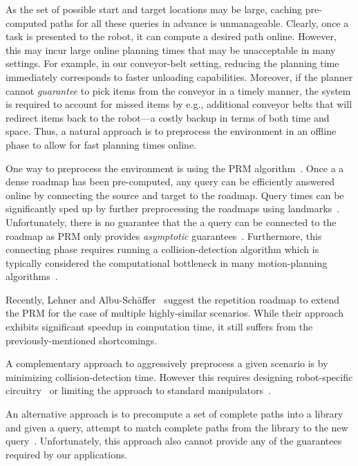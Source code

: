 \documentclass[letterpaper, 10 pt, conference]{ieeeconf}  %
\begin{document}
As the set of possible start and target locations may be large, caching pre-computed paths for all these queries in advance is unmanageable. 
Clearly, once a task is presented to the robot, it can compute a desired path online.
However, this may incur large online planning times that may be unacceptable in many settings.
For example, in our conveyor-belt setting, reducing the planning time immediately corresponds to faster unloading capabilities. 
Moreover, if the planner cannot \emph{guarantee} to pick items from the conveyor in a timely manner, the system is required to account for missed items by e.g., additional conveyor belts that will redirect items back to the robot---a costly backup in terms of both time and space.
Thus, a natural approach is to preprocess the environment in an offline phase to allow for fast planning times online.

One way to preprocess the environment is using the \textsf{PRM} algorithm~\cite{kavraki1996probabilistic}.
Once a a dense roadmap has been pre-computed, any query can be efficiently answered online by connecting the source and target to the roadmap. 
Query times can be significantly sped up by further preprocessing the roadmaps using landmarks~\cite{paden2017landmark}.
Unfortunately, there is no guarantee that the a query can be connected to the roadmap as \textsf{PRM} only provides \emph{asymptotic} guarantees~\cite{KKL98}.
Furthermore, this connecting phase requires running a collision-detection algorithm which is typically considered the computational bottleneck in many motion-planning algorithms~\cite{L06}.

Recently, Lehner and  Albu{-}Sch{\"{a}}ffer~\cite{LA18} suggest the repetition roadmap to extend the \textsf{PRM} for the case of multiple highly-similar scenarios.
While their approach exhibits significant speedup in computation time, it still suffers from the previously-mentioned shortcomings.

A complementary approach to aggressively preprocess a given scenario is by minimizing collision-detection time.
However this requires designing robot-specific
circuitry~\cite{MFQSK16}
or limiting the approach to standard manipulators~\cite{YMILV18}.

An alternative approach is to precompute a set of complete paths into a library and given a query, attempt to match complete paths
from the library to the new query~\cite{berenson2012robot, jetchev2013fast}.
Unfortunately, this approach also cannot provide any of the guarantees required by our applications.
\end{document}
